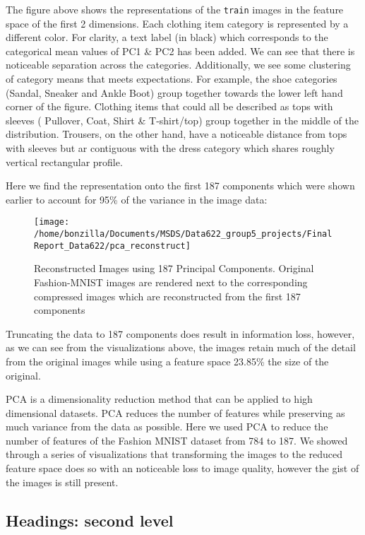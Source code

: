 \documentclass{article}
\begin{document}
The figure above shows the representations of the \texttt{train} images
in the feature space of the first 2 dimensions. Each clothing item
category is represented by a different color. For clarity, a text label
(in black) which corresponds to the categorical mean values of PC1 \&
PC2 has been added. We can see that there is noticeable separation
across the categories. Additionally, we see some clustering of category
means that meets expectations. For example, the shoe categories (Sandal,
Sneaker and Ankle Boot) group together towards the lower left hand
corner of the figure. Clothing items that could all be described as tops
with sleeves ( Pullover, Coat, Shirt \& T-shirt/top) group together in
the middle of the distribution. Trousers, on the other hand, have a
noticeable distance from tops with sleeves but ar contiguous with the
dress category which shares roughly vertical rectangular profile.

Here we find the representation onto the first 187 components which were
shown earlier to account for 95\% of the variance in the image data:

\begin{figure}

{\centering \texttt{[image: /home/bonzilla/Documents/MSDS/Data622\_group5\_projects/FinalReport\_Data622/pca\_reconstruct]} 

}

\caption{Reconstructed Images using 187 Principal Components. Original Fashion-MNIST images are rendered next to the corresponding compressed images which are reconstructed from the first 187 components}\label{fig:unnamed-chunk-6}
\end{figure}

Truncating the data to 187 components does result in information loss,
however, as we can see from the visualizations above, the images retain
much of the detail from the original images while using a feature space
23.85\% the size of the original.

PCA is a dimensionality reduction method that can be applied to high
dimensional datasets. PCA reduces the number of features while
preserving as much variance from the data as possible. Here we used PCA
to reduce the number of features of the Fashion MNIST dataset from 784
to 187. We showed through a series of visualizations that transforming
the images to the reduced feature space does so with an noticeable loss
to image quality, however the gist of the images is still present.

\hypertarget{headings-second-level}{%
\subsection{Headings: second level}\label{headings-second-level}}
\end{document}
